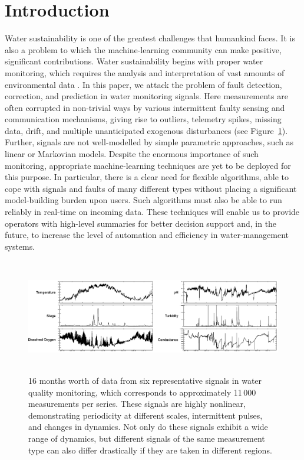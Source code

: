 \documentclass{article} %
\begin{document}
\section{Introduction}

Water sustainability is one of the greatest challenges that humankind
faces. It is also a problem to which the machine-learning community
can make positive, significant contributions. Water sustainability
begins with proper water monitoring, which requires the analysis and
interpretation of vast amounts of environmental data
\citep{wagner2006guidelines}. In this paper, we attack the problem of
fault detection, correction, and prediction in water monitoring
signals.  Here measurements are often corrupted in non-trivial ways by
various intermittent faulty sensing and communication mechanisms,
giving rise to outliers, telemetry spikes, missing data, drift, and
multiple unanticipated exogenous disturbances (see
Figure~\ref{fig:monitoring}).  Further, signals are not well-modelled
by simple parametric approaches, such as linear or Markovian
models. Despite the enormous importance of such monitoring,
appropriate machine-learning techniques are yet to be deployed for
this purpose. In particular, there is a clear need for flexible
algorithms, able to cope with signals and faults of many different
types without placing a significant model-building burden upon
users. Such algorithms must also be able to run reliably in real-time
on incoming data.
These techniques will enable us to provide operators with high-level
summaries for better decision support and, in the future, to increase
the level of automation and efficiency in water-management systems.

\begin{figure}[t!]
\begin{center}
 \includegraphics[width=\textwidth, height=5cm]{watermonitoring.eps}
\end{center}
\caption{16 months worth of data from six representative
signals in water quality monitoring,
which corresponds to approximately 11\,000 measurements per series.
These signals are highly nonlinear, demonstrating periodicity at
different scales,
intermittent pulses, and changes in dynamics. Not only do these
signals exhibit a wide range of dynamics,
but different signals of the same measurement type can also differ
drastically if they are taken in different regions.
}
\label{fig:monitoring}
\end{figure}
\end{document}

